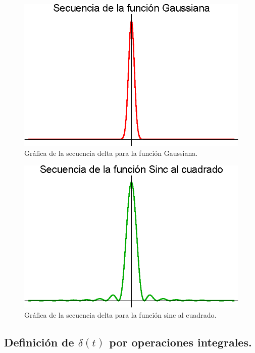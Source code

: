 \begin{figure}[H]
    \centering
    \includegraphics[scale=1]{Imagenes/secuencia_Delta_06.eps}
    \caption{Gráfica de la secuencia delta para la función Gaussiana.}
    \label{fig:figura_05_08}
\end{figure}

\begin{figure}[H]
    \centering
    \includegraphics[scale=1]{Imagenes/secuencia_Delta_07.eps}
    \caption{Gráfica de la secuencia delta para la función sinc al cuadrado.}
    \label{fig:figura_05_09}
\end{figure}

\subsection{Definición de \texorpdfstring{$\delta(t)$}{d(t)} por operaciones integrales.}


